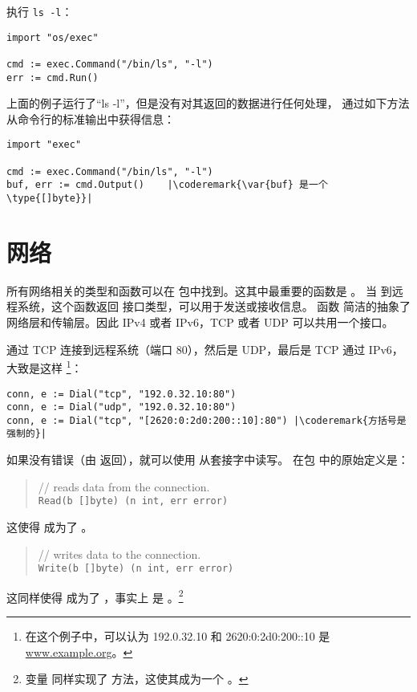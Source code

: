 执行 \verb|ls -l|：
\begin{lstlisting}
import "os/exec"

cmd := exec.Command("/bin/ls", "-l")
err := cmd.Run()
\end{lstlisting}
上面的例子运行了``ls -l''，但是没有对其返回的数据进行任何处理，
通过如下方法从命令行的标准输出中获得信息：
\begin{lstlisting}
import "exec"

cmd := exec.Command("/bin/ls", "-l")
buf, err := cmd.Output()    |\coderemark{\var{buf} 是一个 \type{[]byte}}|
\end{lstlisting}

\section{网络}
所有网络相关的类型和函数可以在  包中找到。这其中最重要的函数是 。
当  到远程系统，这个函数返回  接口类型，可以用于发送或接收信息。
函数  简洁的抽象了网络层和传输层。因此 IPv4 或者 IPv6，TCP 或者 UDP 可以共用一个接口。

通过 TCP 连接到远程系统（端口 80），然后是 UDP，最后是 TCP 通过 IPv6，大致是这样
\footnote{在这个例子中，可以认为 192.0.32.10 和 2620:0:2d0:200::10 是 \url{www.example.org}。}：
\begin{lstlisting}
conn, e := Dial("tcp", "192.0.32.10:80")
conn, e := Dial("udp", "192.0.32.10:80")
conn, e := Dial("tcp", "[2620:0:2d0:200::10]:80") |\coderemark{方括号是强制的}|
\end{lstlisting}

如果没有错误（由  返回），就可以使用  从套接字中读写。
在包  中的原始定义是：
\begin{quote}
//  reads data from the connection.\\
\lstinline{Read(b []byte) (n int, err error)}
\end{quote}
这使得  成为了 。

\begin{quote}
//  writes data to the connection.\\
\lstinline{Write(b []byte) (n int, err error)}
\end{quote}
这同样使得  成为了 ，事实上  是 。\footnote{变量  同样实现了  方法，这使其成为一个 。}

